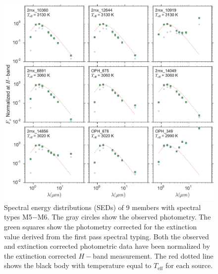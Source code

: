 \documentclass[12pt,preprint]{aastex}
\begin{document}
\begin{figure}[ht!]
  \caption{ Spectral energy distributions (SEDs) of 9 members with spectral types M5$-$M6.  The gray circles show the observed photometry.  The green squares show the photometry corrected for the extinction value derived from the first pass spectral typing.  Both the observed and extinction corrected photometric data have been normalized by the extinction corrected $H-$band measurement.  The red dotted line shows the black body with temperature equal to $T_{\mathrm{eff}}$ for each source.  \label{fig_SEDs_9panel} }
\centering
\includegraphics[scale=0.6]{figures/SEDS_9panel}
\end{figure}
\end{document}
